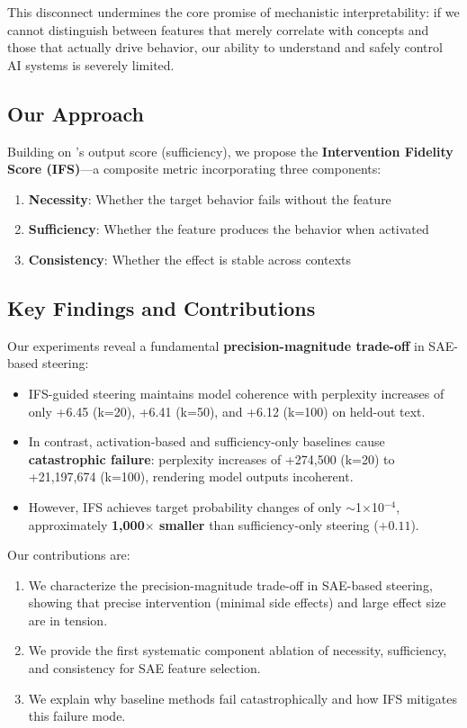 \documentclass{article}
\begin{document}
This disconnect undermines the core promise of mechanistic interpretability: if we cannot distinguish between features that merely correlate with concepts and those that actually drive behavior, our ability to understand and safely control AI systems is severely limited.

\subsection{Our Approach}

Building on \citeauthor{arad2025saes}'s \citeyearpar{arad2025saes} output score (sufficiency), we propose the \textbf{Intervention Fidelity Score (IFS)}---a composite metric incorporating three components:
\begin{enumerate}
    \item \textbf{Necessity}: Whether the target behavior fails without the feature
    \item \textbf{Sufficiency}: Whether the feature produces the behavior when activated
    \item \textbf{Consistency}: Whether the effect is stable across contexts
\end{enumerate}

\subsection{Key Findings and Contributions}

Our experiments reveal a fundamental \textbf{precision-magnitude trade-off} in SAE-based steering:

\begin{itemize}
    \item IFS-guided steering maintains model coherence with perplexity increases of only +6.45 (k=20), +6.41 (k=50), and +6.12 (k=100) on held-out text.
    \item In contrast, activation-based and sufficiency-only baselines cause \textbf{catastrophic failure}: perplexity increases of +274,500 (k=20) to +21,197,674 (k=100), rendering model outputs incoherent.
    \item However, IFS achieves target probability changes of only $\sim$1$\times$10$^{-4}$, approximately \textbf{1,000$\times$ smaller} than sufficiency-only steering ($+0.11$).
\end{itemize}

Our contributions are:
\begin{enumerate}
    \item We characterize the precision-magnitude trade-off in SAE-based steering, showing that precise intervention (minimal side effects) and large effect size are in tension.
    \item We provide the first systematic component ablation of necessity, sufficiency, and consistency for SAE feature selection.
    \item We explain why baseline methods fail catastrophically and how IFS mitigates this failure mode.
\end{enumerate}
\end{document}
